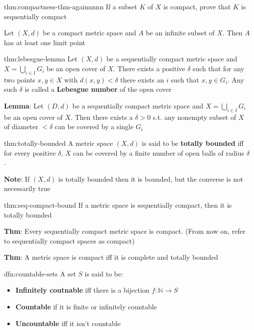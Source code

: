 \documentclass[landscape, 8pt]{extarticle}
\begin{document}
\begin{multicols}{3}
\begin{thm}{thm:compactness-thm-againnnnn}{}
    If a subset $K$ of $X$ is compact, prove that $K$ is sequentially compact

    Let $(X, d)$ be a compact metric space and $A$ be an infinite subset of $X$. Then $A$ has at least one limit point
\end{thm}


\begin{thm}{thm:lebesgue-lemma}{}
    Let $(X, d)$ be a sequentially compact metric space and $X = \bigcup_{i\in I} G_{i}$ be an open cover of $X$. There exists a positive $\delta$ such that for any two points $x, y\in X$ with $d(x, y) < \delta$ there exists an $i$ such that $x, y\in G_{i}$. Any such $\delta$ is called a \textbf{Lebesgue number} of the open cover

    \textbf{Lemma}: Let $(D, d)$ be a sequentially compact metric space and $X = \bigcup_{i\in I} G_{i}$ be an open cover of $X$. Then there exists a $\delta > 0$ s.t. any nonempty subset of $X$ of diameter $< \delta$ can be covered by a single $G_{i}$
\end{thm}

\begin{dfn}{thm:totally-bounded}{}
    A metric space $(X, d)$ is said to be \textbf{totally bounded} iff for every positive $\delta$, $X$ can be covered by a finite number of open balls of radius $\delta$.

    \textbf{Note}: If $(X, d)$ is totally bounded then it is bounded, but the converse is not necessarily true
\end{dfn}

\begin{thm}{thm:seq-compact-bound}{}
    If a metric space is sequentially compact, then it is totally bounded

    \longrule{0.08ex}
    \textbf{Thm}: Every sequentially compact metric space is compact. (From now on, refer to sequentially compact spaces as compact)

    \longrule{0.08ex}
    \textbf{Thm}: A metric space is compact iff it is complete and totally bounded
\end{thm}

\begin{dfn}{dfn:countable-sets}{}
    A set $S$ is said to be:
    \begin{itemize}
        \item \textbf{Infinitely coutnable} iff there is a bijection $f : \mathbb{N} \to S$
        \item \textbf{Countable} if it is finite or infinitely countable
        \item \textbf{Uncountable} iff it isn't countable
    \end{itemize}


\end{dfn}
\end{multicols}
\end{document}
